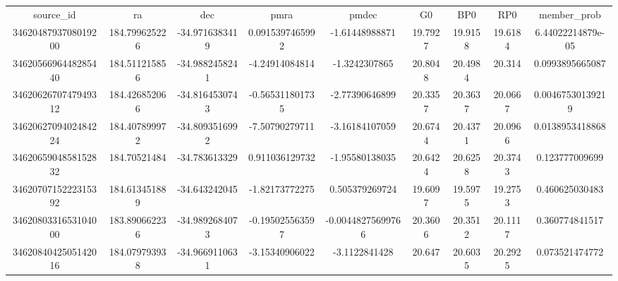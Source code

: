 \begin{table}
\begin{tabular}{ccccccccc}
source_id & ra & dec & pmra & pmdec & G0 & BP0 & RP0 & member_prob \\
3462048793708019200 & 184.799625226 & -34.9716383419 & 0.0915397465992 & -1.61448988871 & 19.7927 & 19.9158 & 19.6184 & 6.44022214879e-05 \\
3462056696448285440 & 184.511215856 & -34.9882458241 & -4.24914084814 & -1.3242307865 & 20.8048 & 20.4984 & 20.314 & 0.0993895665087 \\
3462062670747949312 & 184.426852066 & -34.8164530743 & -0.565311801735 & -2.77390646899 & 20.3357 & 20.3637 & 20.0667 & 0.00467530139219 \\
3462062709402484224 & 184.407899972 & -34.8093516992 & -7.50790279711 & -3.16184107059 & 20.6744 & 20.4371 & 20.0966 & 0.0138953418868 \\
3462065904858152832 & 184.70521484 & -34.783613329 & 0.911036129732 & -1.95580138035 & 20.6424 & 20.6258 & 20.3743 & 0.123777009699 \\
3462070715222315392 & 184.613451889 & -34.643242045 & -1.82173772275 & 0.505379269724 & 19.6097 & 19.5975 & 19.2753 & 0.460625030483 \\
3462080331653104000 & 183.890662236 & -34.9892684073 & -0.195025563597 & -0.00448275699766 & 20.3606 & 20.3512 & 20.1117 & 0.360774841517 \\
3462084042505142016 & 184.079793938 & -34.9669110631 & -3.15340906022 & -3.1122841428 & 20.647 & 20.6035 & 20.2925 & 0.073521474772 \\
\end{tabular}
\end{table}
